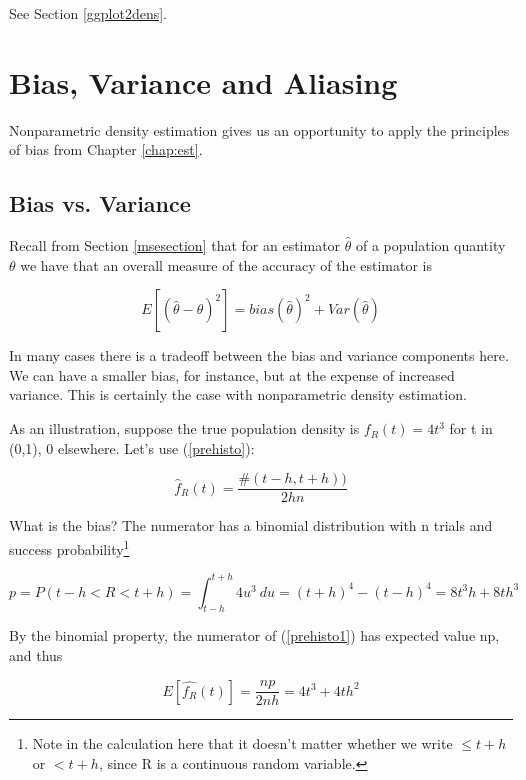 See Section \ref{ggplot2dens}.

\section{Bias, Variance and Aliasing}

Nonparametric density estimation gives us an opportunity to apply the
principles of bias from Chapter \ref{chap:est}.

\subsection{Bias vs. Variance}

Recall from Section \ref{msesection} that for an estimator
$\widehat{\theta}$ of a population quantity $\theta$ we have that an
overall measure of the accuracy of the estimator is

\begin{equation}
\label{msehere}
E[(\widehat{\theta} - \theta)^2] = bias(\widehat{\theta})^2 +
Var(\widehat{\theta})
\end{equation}

In many cases there is a tradeoff between the bias and variance
components here.  We can have a smaller bias, for instance, but at the
expense of increased variance.  This is certainly the case with
nonparametric density estimation.

As an illustration, suppose the true population density is $f_R(t) = 4
t^3$ for t in (0,1), 0 elsewhere.  Let's use (\ref{prehisto}):

\begin{equation}
\widehat{f}_R(t) 
= \frac{\#(t-h,t+h))}{2hn}  
\label{prehisto1}
\end{equation}

What is the bias?  The numerator has a binomial distribution with n
trials and success probability\footnote{Note in the calculation here
that it doesn't matter whether we write $\leq t+h$ or $< t+h$, since R
is a continuous random variable.}

\begin{equation}
\label{usebinom}
p = P(t - h < R < t+h)
=  \int_{t-h}^{t+h} 4u^3 ~ du =
 (t+h)^4 - (t-h)^4
= 8t^3h+8th^3
\end{equation}

By the binomial property, the numerator of (\ref{prehisto1})  has
expected value np, and thus

\begin{equation}
E[\widehat{f_R}(t)] = 
\frac{np}{2nh} = 4t^3 + 4th^2
\end{equation}  

